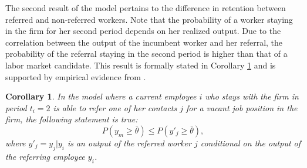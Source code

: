 \documentclass[12pt]{article}
\newtheorem{corollary}[theorem]{Corollary}
\begin{document}
The second result of the model pertains to the difference in retention between referred and non-referred workers. Note that the probability of a worker staying in the firm for her second period depends on her realized output. Due to the correlation between the output of the incumbent worker and her referral, the probability of the referral staying in the second period is higher than that of a labor market candidate. This result is formally stated in Corollary \ref{cor:retention_vr} and is supported by empirical evidence from \cite{simon1992matchmaker, coverdill1998personal, petersen2000offering, kugler2003employee, heath2018firms}.
\begin{corollary}\label{cor:retention_vr}
    In the model where a current employee $i$ who stays with the firm in period $t_i = 2$ is able to refer one of her contacts $j$ for a vacant job position in the firm, the following statement is true:
    \begin{equation}
        P(y_m \geq \bar{\theta}) \leq P(y'_j \geq \bar{\theta}),
    \end{equation}
    where $y'_j = y_j | y_i$ is an output of the referred worker $j$ conditional on the output of the referring employee $y_i$.
\end{corollary}
\end{document}
